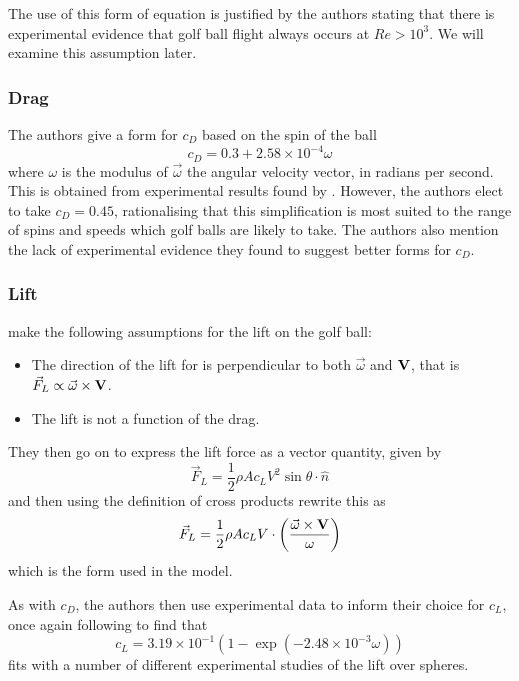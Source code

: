 The use of this form of equation is justified by the authors stating that there is experimental evidence
that golf ball flight always occurs at $Re > 10^3$. We will examine this assumption later.

\subsubsection{Drag}

The authors give a form for $c_D$ based on the spin of the ball
\begin{equation}
c_D = 0.3 + 2.58\times10^{-4}\omega
\end{equation}
where $\omega$ is the modulus of $\vec{\omega}$ the angular velocity vector, in radians per second. This is obtained 
from experimental results found by
\citet{davies1949aerodynamics}. However, the authors elect to take $c_D = 0.45$, rationalising that
this simplification is most suited to the range of spins and speeds which golf balls are likely to
take. The authors also mention the lack of experimental evidence they found to suggest better forms
for $c_D$.

\subsubsection{Lift}

\citeauthor*{Robinson2013} make the following assumptions for the lift on the golf ball:
\begin{itemize}
\item The direction of the lift for is perpendicular to both $\vec{\omega}$ and $\mathbf{V}$, that is $\vec{F}_{L} \propto \vec{\omega} \times \mathbf{V}$.
\item The lift is not a function of the drag.
\end{itemize}

They then go on to express the lift force as a vector quantity, given by
\begin{equation}
\vec{F}_{L} = \frac{1}{2} \rho A c_{L} V^2 \sin \theta \cdot \hat{n}
\end{equation}
and then using the definition of cross products rewrite this as
\begin{equation}
\vec{F}_L = \frac{1}{2} \rho A c_L V \cdot \left(\frac{\vec{\omega} \times \mathbf{V}}{\omega}\right)
\end{equation}
which is the form used in the model.

As with $c_D$, the authors then use experimental data to inform their choice for $c_L$, once again
following \citet{davies1949aerodynamics} to find that
\begin{equation} \label{cl-rr}
c_L = 3.19\times10^{-1} \left(1 - \exp(-2.48\times10^{-3} \omega)\right)
\end{equation}
fits with a number of different experimental studies of the lift over spheres.

